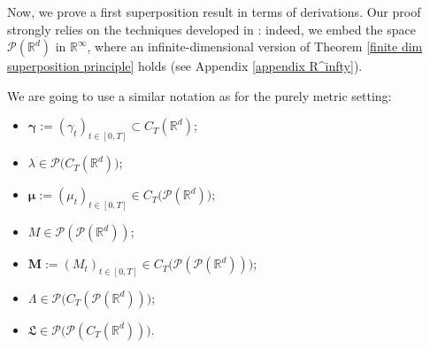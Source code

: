 \documentclass[10pt,leqno]{amsart}
\numberwithin{equation}{section}
\newcommand{\R}{\mathbb{R}}
\newcommand{\PP}{\mathcal{P}}
\begin{document}
Now, we prove a first superposition result in terms of derivations.
Our proof strongly relies on the techniques developed in \cite{ambrosio2014well}: indeed, we embed the space $\PP(\R^d)$ in $\R^\infty$, where an infinite-dimensional version of Theorem \ref{finite dim superposition principle} holds (see Appendix \ref{appendix R^infty}). 

We are going to use a similar notation as for the purely metric setting:
\begin{itemize}
    \item $\boldsymbol{\gamma}:= (\gamma_t)_{t\in[0,T]} \subset C_T(\R^d)$;
    \item $\lambda \in \PP\big(C_T(\R^d)\big)$;
    \item $\boldsymbol{\mu}:=(\mu_t)_{t\in[0,T]}\in C_T\big( 
    \PP(\R^d) \big)$;
    \item $M\in \PP(\PP(\R^d))$;
    \item $\boldsymbol{M}:=(M_t)_{t\in[0,T]} \in C_T\big(\PP(\PP(\R^d))\big)$;
    \item $\Lambda \in \PP\big(
    C_T(\PP(\R^d))\big)$;
    \item $\mathfrak{L}\in \PP\big(\PP(C_T(\R^d))\big)$.
\end{itemize}
\end{document}
